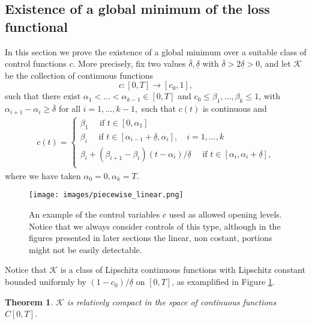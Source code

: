 \documentclass{amsart}
\newtheorem{teo}{Theorem}[section]
\begin{document}
\subsection{Existence of a global minimum of the loss functional}
\label{4.1}
In this section we  prove the existence of a global minimum over a suitable class of control functions $c$.
More precisely, fix two values $\overline \delta,
\underline \delta $ with $\overline \delta > 2
\underline \delta>0 $, and let 
$\mathcal{K}$ be the collection of continuous
functions 
$$c:[0,T]\rightarrow [c_0,1],
$$ 
such that there exist
$ \alpha_1< \dots < \alpha_{k-1}\in [0,T]$ and 
$c_0\leq \beta_1, \dots, \beta_k\leq 1$, with
$\alpha_{i+1}-\alpha_i \geq \overline \delta$
for all $i=1,\dots, k-1,$
such that $ c(t)$  is continuous and 
\begin{eqnarray}\label{piecelin}
c(t)=\begin{cases}
\beta_1 \quad \text{ if } t \in [0,\alpha_1]\\
\beta_i \quad \text{ if } t \in [\alpha_{i-1}+\underline \delta,\alpha_i], \quad
i=1, \dots, k\\
 \beta_i+(\beta_{i+1}-\beta_i)(t-\alpha_i)/\underline \delta\quad \text{ if } t \in [\alpha_{i},\alpha_i+\underline \delta],\\

\end{cases}
\end{eqnarray}
where we have taken $\alpha_0=0, \alpha_k=T$.
\begin{figure}
    \centering
    \texttt{[image: images/piecewise\_linear.png]}
    \caption{An example of the control variables $c$ used as allowed opening levels. Notice that we always consider controls of this type,
although in the figures presented in 
later sections the linear, non costant, portions might not be
easily detectable. }
    \label{fig:piecewise_linear}
\end{figure}
Notice that $\mathcal{K}$ is a class of Lipschitz continuous functions with Lipschitz constant bounded uniformly by $(1-c_0)/\underline \delta$ on $[0,T]$, as examplified in Figure \ref{fig:piecewise_linear}.
\begin{teo}
$\mathcal{K}$ is relatively compact in the space of continuous functions $C[0,T]$.
\end{teo}
\end{document}
